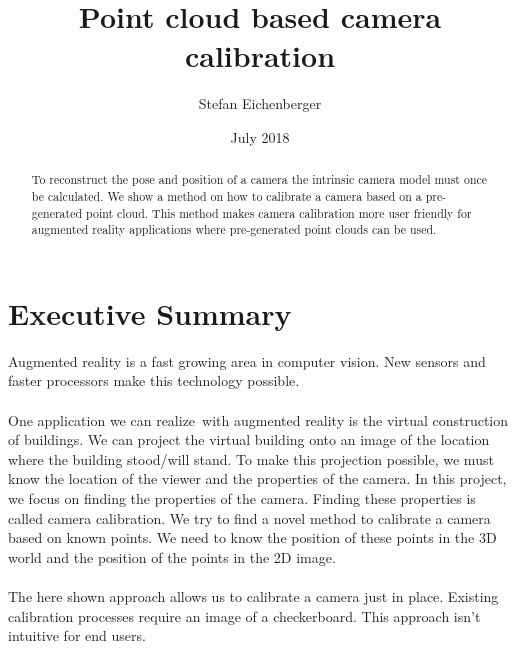 \documentclass[11pt,a4paper,titlepage,oneside]{report}
\title{Point cloud based camera calibration}
\author{Stefan Eichenberger}
\date{July 2018}
\begin{document}
\maketitle

\begin{abstract}
To reconstruct the pose and position of a camera the intrinsic camera model must once be calculated. We show a method on how to calibrate a camera based on a pre-generated point cloud. This method makes camera calibration more user friendly for augmented reality applications where pre-generated point clouds can be used.
\end{abstract}

\section*{Executive Summary}
Augmented reality is a fast growing area in computer vision. New sensors and faster processors make this technology possible.\\\\
One application we can realize with augmented reality is the virtual construction of buildings. We can project the virtual building onto an image of the location where the building stood/will stand. To make this projection possible, we must know the location of the viewer and the properties of the camera. In this project, we focus on finding the properties of the camera. Finding these properties is called camera calibration. We try to find a novel method to calibrate a camera based on known points. We need to know the position of these points in the 3D world and the position of the points in the 2D image.\\\\
The here shown approach allows us to calibrate a camera just in place. Existing calibration processes require an image of a checkerboard. This approach isn't intuitive for end users.

\tableofcontents
\end{document}

